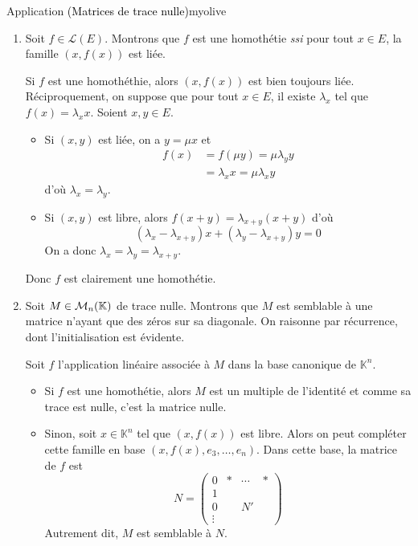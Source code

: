     \begin{omed}{Application \textcolor{black}{(Matrices de trace nulle)}}{myolive}
        \begin{enumerate}
            \item Soit $f \in \mathcal{L}(E)$. Montrons que $f$ est une homothétie \textit{ssi} pour tout $x \in E$, la famille $(x,f(x))$ est liée.
            
            Si $f$ est une homothéthie, alors $(x,f(x))$ est bien toujours liée.
            Réciproquement, on suppose que pour tout $x \in E$, il existe $\lambda_x$ tel que $f(x) = \lambda_x x$. Soient $x,y \in E$.
            \begin{itemize}
                \item Si $(x,y)$ est liée, on a $y = \mu x$ et
                \begin{align*}
                    f(x) &= f(\mu y) = \mu \lambda_y y \\
                    &= \lambda_x x = \mu \lambda_x y 
                \end{align*}
                d’où $\lambda_x = \lambda_y$.
                \item Si $(x,y)$ est libre, alors $f(x + y) = \lambda_{x+y}(x+y)$ d’où 
                \[ (\lambda_x - \lambda_{x+y})x + (\lambda_y - \lambda_{x+y})y = 0 \]   
                On a donc $\lambda_x = \lambda_y = \lambda_{x + y}$.
            \end{itemize}
            Donc $f$ est clairement une homothétie.
            \item Soit $M \in \mathcal{M}_{n}(\mathbb{K})$ de trace nulle. Montrons que $M$ est semblable à une matrice n’ayant que des zéros sur sa diagonale. On raisonne par récurrence, dont l’initialisation est évidente.
            
            Soit $f$ l’application linéaire associée à $M$ dans la base canonique de $\mathbb{K}^n$. 
            \begin{itemize}
                \item Si $f$ est une homothétie, alors $M$ est un multiple de l’identité et comme sa trace est nulle, c’est la matrice nulle.
                \item Sinon, soit $x \in \mathbb{K}^n$ tel que $(x,f(x))$ est libre. Alors on peut compléter cette famille en base $(x,f(x), e_3,\ldots,e_n)$. Dans cette base, la matrice de $f$ est 
                \[ N=\left(\begin{array}{c|ccc}
                    0&*&\cdots&*\\
                    \hline
                    1&\\
                    0&&N'\\
                    \vdots&
                    \end{array}\right) \]
                Autrement dit, $M$ est semblable à $N$. 


\end{itemize}
\end{enumerate}
\end{omed}
